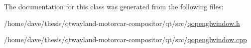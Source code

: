 The documentation for this class was generated from the following files\-:\begin{DoxyCompactItemize}
\item 
/home/dave/thesis/qtwayland-\/motorcar-\/compositor/qt/src/\hyperlink{qopenglwindow_8h}{qopenglwindow.\-h}\item 
/home/dave/thesis/qtwayland-\/motorcar-\/compositor/qt/src/\hyperlink{qopenglwindow_8cpp}{qopenglwindow.\-cpp}\end{DoxyCompactItemize}
